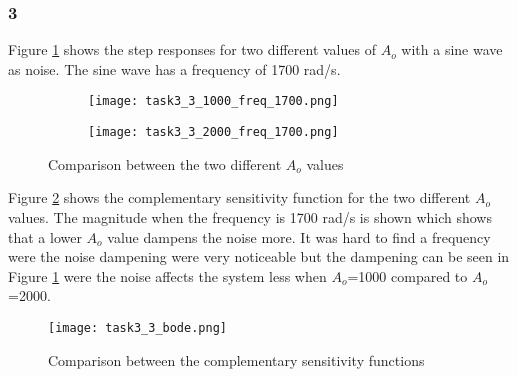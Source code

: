 \subsubsection*{3}

Figure \ref{fig:task3_3_1000_freq_1700} shows the step responses for two
different values of $A_o$ with a sine wave as noise. The sine wave has a
frequency of 1700 rad/s.

\begin{figure}[H]
    \centering
    \begin{subfigure}[b]{0.45\textwidth}
        \texttt{[image: task3\_3\_1000\_freq\_1700.png]}
    \end{subfigure}
    \begin{subfigure}[b]{0.45\textwidth}
        \texttt{[image: task3\_3\_2000\_freq\_1700.png]}
    \end{subfigure}
	\caption{Comparison between the two different $A_o$ values}
	\label{fig:task3_3_1000_freq_1700}
\end{figure}

Figure \ref{fig:task3_3_bode} shows the complementary sensitivity
function for the two different $A_o$ values. The magnitude when the
frequency is 1700 rad/s is shown which shows that a lower $A_o$ value
dampens the noise more. It was hard to find a frequency were the noise
dampening were very noticeable but the dampening can be seen in Figure
\ref{fig:task3_3_1000_freq_1700} were the noise affects the system less
when $A_o$=1000 compared to $A_o$=2000.

\begin{figure}[H]
	\begin{center}
	
		\texttt{[image: task3\_3\_bode.png]}
		\caption{Comparison between the complementary sensitivity functions}
		\label{fig:task3_3_bode}
	\end{center}
\end{figure}


%
